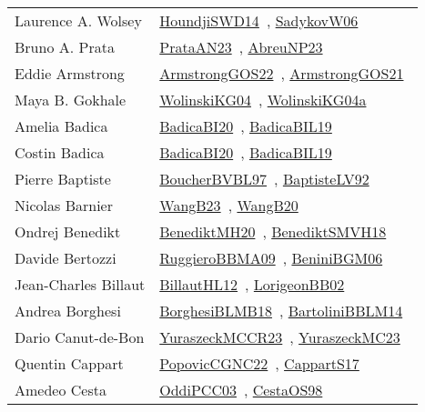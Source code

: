 {\begin{longtable}{p{4cm}p{20cm}}
Laurence A. Wolsey & \href{works/HoundjiSWD14.pdf}{HoundjiSWD14}~\cite{HoundjiSWD14}, \href{works/SadykovW06.pdf}{SadykovW06}~\cite{SadykovW06}\\
Bruno A. Prata & \href{works/PrataAN23.pdf}{PrataAN23}~\cite{PrataAN23}, \href{}{AbreuNP23}~\cite{AbreuNP23}\\
Eddie Armstrong & \href{works/ArmstrongGOS22.pdf}{ArmstrongGOS22}~\cite{ArmstrongGOS22}, \href{works/ArmstrongGOS21.pdf}{ArmstrongGOS21}~\cite{ArmstrongGOS21}\\
Maya B. Gokhale & \href{works/WolinskiKG04.pdf}{WolinskiKG04}~\cite{WolinskiKG04}, \href{}{WolinskiKG04a}~\cite{WolinskiKG04a}\\
Amelia Badica & \href{works/BadicaBI20.pdf}{BadicaBI20}~\cite{BadicaBI20}, \href{works/BadicaBIL19.pdf}{BadicaBIL19}~\cite{BadicaBIL19}\\
Costin Badica & \href{works/BadicaBI20.pdf}{BadicaBI20}~\cite{BadicaBI20}, \href{works/BadicaBIL19.pdf}{BadicaBIL19}~\cite{BadicaBIL19}\\
Pierre Baptiste & \href{}{BoucherBVBL97}~\cite{BoucherBVBL97}, \href{works/BaptisteLV92.pdf}{BaptisteLV92}~\cite{BaptisteLV92}\\
Nicolas Barnier & \href{works/WangB23.pdf}{WangB23}~\cite{WangB23}, \href{works/WangB20.pdf}{WangB20}~\cite{WangB20}\\
Ondrej Benedikt & \href{works/BenediktMH20.pdf}{BenediktMH20}~\cite{BenediktMH20}, \href{works/BenediktSMVH18.pdf}{BenediktSMVH18}~\cite{BenediktSMVH18}\\
Davide Bertozzi & \href{works/RuggieroBBMA09.pdf}{RuggieroBBMA09}~\cite{RuggieroBBMA09}, \href{works/BeniniBGM06.pdf}{BeniniBGM06}~\cite{BeniniBGM06}\\
Jean{-}Charles Billaut & \href{works/BillautHL12.pdf}{BillautHL12}~\cite{BillautHL12}, \href{works/LorigeonBB02.pdf}{LorigeonBB02}~\cite{LorigeonBB02}\\
Andrea Borghesi & \href{works/BorghesiBLMB18.pdf}{BorghesiBLMB18}~\cite{BorghesiBLMB18}, \href{works/BartoliniBBLM14.pdf}{BartoliniBBLM14}~\cite{BartoliniBBLM14}\\
Dario Canut{-}de{-}Bon & \href{works/YuraszeckMCCR23.pdf}{YuraszeckMCCR23}~\cite{YuraszeckMCCR23}, \href{works/YuraszeckMC23.pdf}{YuraszeckMC23}~\cite{YuraszeckMC23}\\
Quentin Cappart & \href{works/PopovicCGNC22.pdf}{PopovicCGNC22}~\cite{PopovicCGNC22}, \href{works/CappartS17.pdf}{CappartS17}~\cite{CappartS17}\\
Amedeo Cesta & \href{works/OddiPCC03.pdf}{OddiPCC03}~\cite{OddiPCC03}, \href{works/CestaOS98.pdf}{CestaOS98}~\cite{CestaOS98}\\

\end{longtable}}
